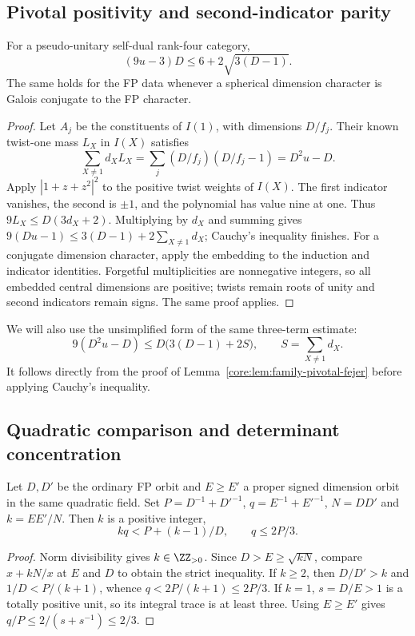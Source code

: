 \subsection{Pivotal positivity and second-indicator parity}
\begin{lemma}\label{core:lem:family-pivotal-fejer}
For a pseudo-unitary self-dual rank-four category,
\[
 (9u-3)D\le6+2\sqrt{3(D-1)}.
\]
The same holds for the FP data whenever a spherical dimension
character is Galois conjugate to the FP character.
\end{lemma}
\begin{proof}
Let $A_j$ be the constituents of $I(1)$, with dimensions $D/f_j$.
Their known twist-one mass $L_X$ in $I(X)$ satisfies
\[
 \sum_{X\ne1}d_X L_X=\sum_j(D/f_j)(D/f_j-1)=D^2u-D.
\]
Apply $|1+z+z^2|^2$ to the positive twist weights of $I(X)$.
The first indicator vanishes, the second is $\pm1$, and the
polynomial has value nine at one. Thus
$9L_X\le D(3d_X+2)$. Multiplying by $d_X$ and summing gives
$9(Du-1)\le3(D-1)+2\sum_{X\ne1}d_X$; Cauchy's inequality
finishes. For a conjugate dimension character, apply the embedding
to the induction and indicator identities. Forgetful multiplicities
are nonnegative integers, so all embedded central dimensions are
positive; twists remain roots of unity and second indicators remain
signs. The same proof applies.
\end{proof}


We will also use the unsimplified form of the same three-term estimate:
\begin{equation}\label{core:three-term-unsimplified}
9(D^2u-D)\le D\bigl(3(D-1)+2S\bigr),
\qquad S=\sum_{X\ne1}d_X.
\end{equation}
It follows directly from the proof of
Lemma~\ref{core:lem:family-pivotal-fejer} before applying Cauchy's inequality.
\subsection{Quadratic comparison and determinant concentration}
\begin{lemma}\label{core:lem:family-comparison}
Let $D,D'$ be the ordinary FP orbit and $E\ge E'$ a proper signed
dimension orbit in the same quadratic field. Set
$P=D^{-1}+D'^{-1}$, $q=E^{-1}+E'^{-1}$, $N=DD'$ and
$k=EE'/N$. Then $k$ is a positive integer,
\begin{equation}\label{core:quadratic-strict}
 kq<P+(k-1)/D,\qquad q\le2P/3.
\end{equation}
\end{lemma}
\begin{proof}
Norm divisibility gives $k\in\ZZ_{>0}$. Since
$D>E\ge\sqrt{kN}$, compare $x+kN/x$ at $E$ and $D$ to obtain
the strict inequality. If $k\ge2$, then $D/D'>k$ and
$1/D<P/(k+1)$, whence $q<2P/(k+1)\le2P/3$.
If $k=1$, $s=D/E>1$ is a totally positive unit, so its integral
trace is at least three. Using $E\ge E'$ gives
$q/P\le2/(s+s^{-1})\le2/3$.
\end{proof}


